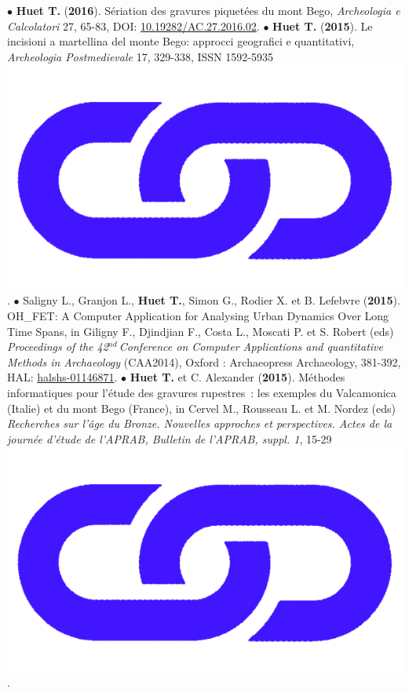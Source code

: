 \documentclass{article}
\begin{document}
{\smallbreak
$\bullet$ \textbf{Huet T.} (\textbf{2016}). S\'{e}riation des gravures piquet\'{e}es du mont Bego, \textit{Archeologia e Calcolatori} 27, 65-83, DOI: \href{https://doi.org/10.19282/AC.27.2016.02}{10.19282/AC.27.2016.02}.
\smallbreak
$\bullet$ \textbf{Huet T.} (\textbf{2015}). Le incisioni a martellina del monte Bego: approcci geografici e quantitativi, \textit{Archeologia Postmedievale} 17, 329-338, ISSN 1592-5935 \href{https://www.insegnadelgiglio.it/wp-content/uploads/2015/01/APM_17_libro-anteprima.pdf}{\includegraphics[scale=0.02]{link_darkblue.png}}.
\smallbreak
$\bullet$ Saligny L., Granjon L., \textbf{Huet T.}, Simon G., Rodier X. et B. Lefebvre (\textbf{2015}). OH\_FET: A Computer Application for Analysing Urban Dynamics Over Long Time Spans, in Giligny F., Djindjian F., Costa L., Moscati P. et S. Robert (eds) \textit{Proceedings of the 42${}^{nd\ }$Conference on Computer Applications and quantitative Methods in Archaeology} (CAA2014), Oxford : Archaeopress Archaeology, 381-392, HAL: \href{https://hal.archives-ouvertes.fr/halshs-01146871}{halshs-01146871}.
\smallbreak
$\bullet$ \textbf{Huet T.} et C. Alexander (\textbf{2015}). M\'{e}thodes informatiques pour l'\'{e}tude des gravures rupestres~: les exemples du Valcamonica (Italie) et du mont Bego (France), in Cervel M., Rousseau L. et M. Nordez (eds) \textit{Recherches sur l'\^{a}ge du Bronze. Nouvelles approches et perspectives. Actes de la journ\'{e}e d'\'{e}tude de l'APRAB, Bulletin de l'APRAB, suppl. 1}, 15-29 
\href{https://www.researchgate.net/publication/347437308_Methodes_informatiques_pour_l'etude_des_gravures_rupestres_les_exemples_du_Valcamonica_Italie_et_du_mont_Bego_France}{\includegraphics[scale=0.02]{link_darkblue.png}}.
}
\end{document}
